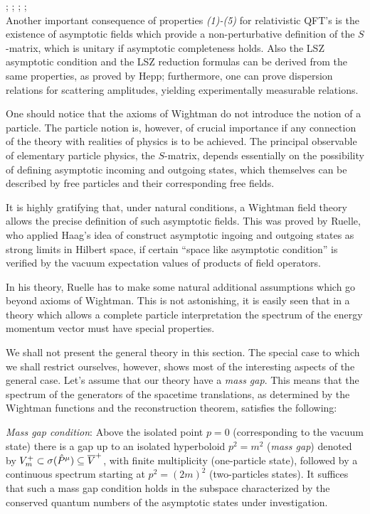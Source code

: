 \documentclass[../main/main.tex]{subfiles}
\begin{document}
\cite{Ruelle:1962}; \cite{Hepp:1965}; \cite[Chapter II.4]{Haag_1996}; \cite[Chapters 6]{Jost.:1965}; \cite[Sections 6.1-6.2]{Strocchi_2013}\\

Another important consequence of properties \textit{(1)-(5)} for relativistic QFT's is the existence of asymptotic fields which provide a non-perturbative definition of the $S$-matrix, which is unitary if asymptotic completeness holds. Also the LSZ asymptotic condition and the LSZ reduction formulas can be derived from the same properties, as proved by Hepp; furthermore, one can prove dispersion relations for scattering amplitudes, yielding experimentally measurable relations. 

\skipline%

One should notice that the axioms of Wightman do not introduce the notion of a particle. The particle notion is, however, of crucial importance if any connection of the theory with realities of physics is to be achieved. The principal observable of elementary particle physics, the $S$-matrix, depends essentially on the possibility of defining asymptotic incoming and outgoing states, which themselves can be described by free particles and their corresponding free fields. 

It is highly gratifying that, under natural conditions, a Wightman field theory allows the precise definition of such asymptotic fields. This was proved by Ruelle, who applied Haag's idea of construct asymptotic ingoing and outgoing states as strong limits in Hilbert space, if certain ``space like asymptotic condition'' is verified by the vacuum expectation values of products of field operators. 

In his theory, Ruelle has to make some natural additional assumptions which go beyond axioms of Wightman. This is not astonishing, it is easily seen that in a theory which allows a complete particle interpretation the spectrum of the energy momentum vector must have special properties. 

\skipline%

We shall not present the general theory in this section. The special case to which we shall restrict ourselves, however, shows most of the interesting aspects of the general case. Let's assume that our theory have a \emph{mass gap}. This means that the spectrum of the generators of the spacetime translations, as determined by the Wightman functions and the reconstruction theorem, satisfies the following:

\emph{Mass gap condition}: Above the isolated point $p=0$ (corresponding to the vacuum state) there is a gap up to an isolated hyperboloid $p^2=m^2$ (\emph{mass gap}) denoted by $V_m^+\subset\sigma(\hat{P}^\mu)\subseteq\overline V^+$, with finite multiplicity (one-particle state), followed by a continuous spectrum starting at $p^2=(2m)^2$ (two-particles states). It suffices that such a mass gap condition holds in the subspace characterized by the conserved quantum numbers of the asymptotic states under investigation. 
\end{document}
